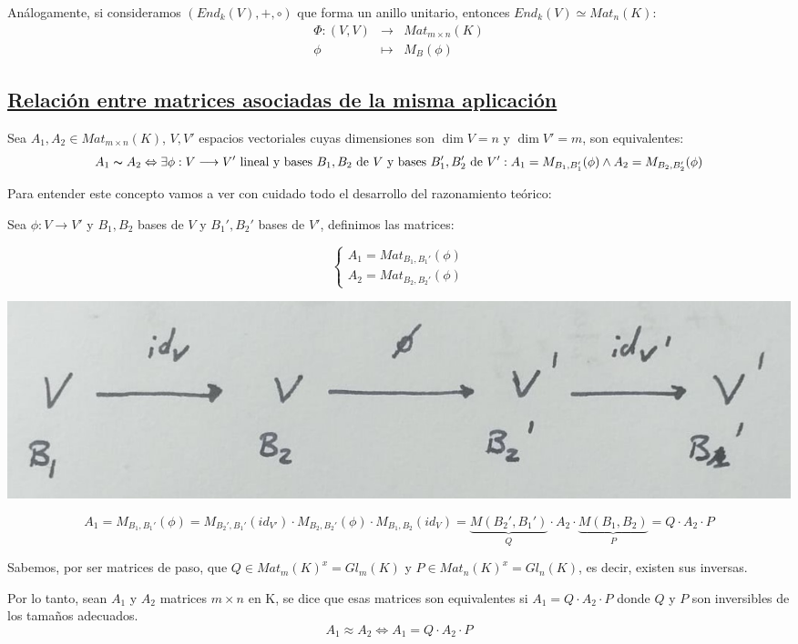\documentclass[10pt,a4paper,openright]{book}
\begin{document}
Análogamente, si consideramos $(End_k(V), +, \circ)$ que forma un anillo unitario, entonces $End_k(V)\simeq Mat_n(K)$:
\begin{eqnarray*} \Phi:(V,V) &\longrightarrow& Mat_{m\times n}(K)\\ \phi &\longmapsto& M_{B}(\phi) 
\end{eqnarray*} 


\subsection*{\underline{Relación entre matrices asociadas de la misma aplicación}}
Sea $A_1, A_2\in Mat_{m\times n}(K)$, $V, V'$ espacios vectoriales cuyas dimensiones son $\dim V=n$ y $\dim V'=m$, son equivalentes:
$$A_1\thicksim A_2 \Leftrightarrow \exists \phi: V\longrightarrow V'\mbox{ lineal y bases } B_1,B_2\mbox{ de }V \mbox{ y bases }B_1', B_2'\mbox{ de }V': A_1=M_{B_1,B_1'}(\phi) \wedge A_2=M_{B_2,B_2'}(\phi)$$

Para entender este concepto vamos a ver con cuidado todo el desarrollo del razonamiento teórico:\par

Sea $\phi: V\longrightarrow V'$ y $B_1, B_2$ bases de $V$ y $B_1', B_2'$ bases de $V'$, definimos las matrices:

$$\begin{cases}A_1=Mat_{B_1,B_1'}(\phi)\\ A_2=Mat_{B_2,B_2'}{}(\phi)\end{cases}$$

\begin{center}
\includegraphics[scale=0.35]{Matrices equivalentes}
\end{center}
$$A_1=M_{B_1,B_1'}(\phi)=M_{B_2',B_1'}(id_{V'})\cdot M_{B_2,B_2'}(\phi)\cdot M_{B_1, B_2}(id_V)=\underbrace{M(B_2',B_1')}_{Q}\cdot A_2\cdot \underbrace{M(B_1,B_2)}_{P}=Q\cdot A_2\cdot P$$

Sabemos, por ser matrices de paso, que $Q\in Mat_m(K)^x=Gl_m(K)$ y $P\in Mat_n(K)^x=Gl_n(K)$, es decir, existen sus inversas.

Por lo tanto, sean $A_1$ y $A_2$ matrices $m\times n$ en K, se dice que esas matrices son equivalentes si $A_1=Q\cdot A_2\cdot P$ donde $Q$ y $P$ son inversibles de los tamaños adecuados.
$$A_1\approx A_2 \Leftrightarrow A_1=Q\cdot A_2\cdot P$$
\end{document}
